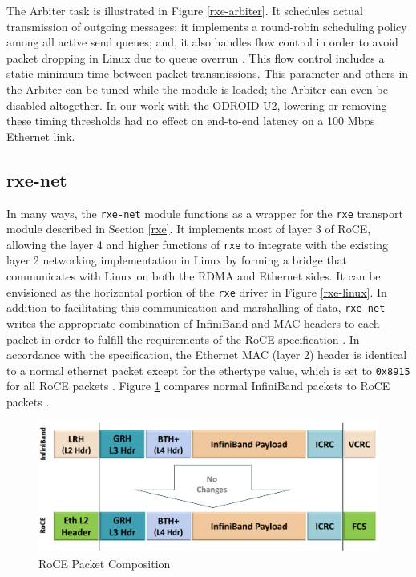 \documentclass[11pt]{book}
\begin{document}
The Arbiter task is illustrated in Figure \ref{rxe-arbiter}.  It schedules actual
transmission of outgoing messages; it implements a round-robin scheduling policy among all
active send queues; and, it also handles flow control in order to avoid packet dropping in
Linux due to queue overrun \cite{pearson-10}.  This flow control includes a static minimum
time between packet transmissions.  This parameter and others in the Arbiter can be tuned
while the module is loaded; the Arbiter can even be disabled altogether.  In our work with
the ODROID-U2, lowering or removing these timing thresholds had no effect on end-to-end
latency on a 100 Mbps Ethernet link.

\subsection{rxe-net}

In many ways, the \verb;rxe-net; module functions as a wrapper for the \verb;rxe;
transport module described in Section \ref{rxe}.  It implements most of layer 3 of RoCE,
allowing the layer 4 and higher functions of \verb;rxe; to integrate with the existing
layer 2 networking implementation in Linux by forming a bridge that communicates with
Linux on both the RDMA and Ethernet sides.  It can be envisioned as the horizontal portion
of the \verb;rxe; driver in Figure \ref{rxe-linux}.  In addition to facilitating this
communication and marshalling of data, \verb;rxe-net; writes the appropriate combination
of InfiniBand and MAC headers to each packet in order to fulfill the requirements of the
RoCE specification \cite{pearson-10,InfiniBandTARoCE-10}.  In accordance with the
specification, the Ethernet MAC (layer 2) header is identical to a normal ethernet packet
except for the ethertype value, which is set to \verb;0x8915; for all RoCE packets
\cite{InfiniBandTARoCE-10}.  Figure \ref{roce-packet} compares normal InfiniBand packets
to RoCE packets \cite{ayoub-11,InfiniBandTABase-07,InfiniBandTARoCE-10}.

\begin{figure}
\includegraphics[width=\textwidth]{roce_packet}
\caption{RoCE Packet Composition \cite{ayoub-11}}\label{roce-packet}
\end{figure}
\end{document}
